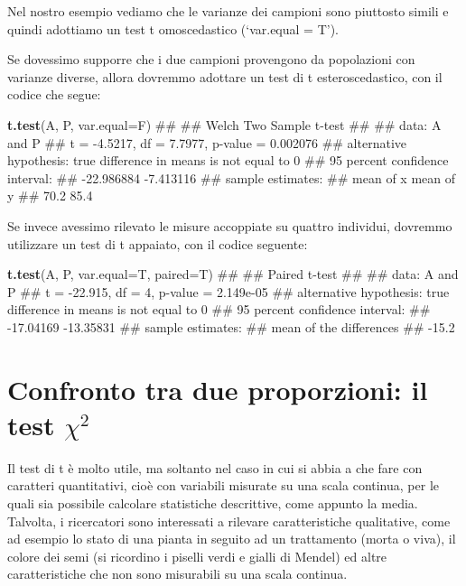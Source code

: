 \documentclass[a4paper,12pt,oneside]{book}
\newenvironment{Shaded}{\begin{snugshade}}{\end{snugshade}}
\newcommand{\KeywordTok}[1]{\textcolor[rgb]{0.13,0.29,0.53}{\textbf{#1}}}
\newcommand{\DataTypeTok}[1]{\textcolor[rgb]{0.13,0.29,0.53}{#1}}
\newcommand{\NormalTok}[1]{#1}
\theoremstyle{definition}
\theoremstyle{definition}
\theoremstyle{definition}
\theoremstyle{remark}
\begin{document}
Nel nostro esempio vediamo che le varianze dei campioni sono piuttosto
simili e quindi adottiamo un test t omoscedastico (`var.equal = T').

Se dovessimo supporre che i due campioni provengono da popolazioni con
varianze diverse, allora dovremmo adottare un test di t
esteroscedastico, con il codice che segue:

\begin{Shaded}
\begin{Highlighting}[]
\KeywordTok{t.test}\NormalTok{(A, P, }\DataTypeTok{var.equal=}\NormalTok{F)}
\NormalTok{## }
\NormalTok{##  Welch Two Sample t-test}
\NormalTok{## }
\NormalTok{## data:  A and P}
\NormalTok{## t = -4.5217, df = 7.7977, p-value = 0.002076}
\NormalTok{## alternative hypothesis: true difference in means is not equal to 0}
\NormalTok{## 95 percent confidence interval:}
\NormalTok{##  -22.986884  -7.413116}
\NormalTok{## sample estimates:}
\NormalTok{## mean of x mean of y }
\NormalTok{##      70.2      85.4}
\end{Highlighting}
\end{Shaded}

Se invece avessimo rilevato le misure accoppiate su quattro individui,
dovremmo utilizzare un test di t appaiato, con il codice seguente:

\begin{Shaded}
\begin{Highlighting}[]
\KeywordTok{t.test}\NormalTok{(A, P, }\DataTypeTok{var.equal=}\NormalTok{T, }\DataTypeTok{paired=}\NormalTok{T)}
\NormalTok{## }
\NormalTok{##  Paired t-test}
\NormalTok{## }
\NormalTok{## data:  A and P}
\NormalTok{## t = -22.915, df = 4, p-value = 2.149e-05}
\NormalTok{## alternative hypothesis: true difference in means is not equal to 0}
\NormalTok{## 95 percent confidence interval:}
\NormalTok{##  -17.04169 -13.35831}
\NormalTok{## sample estimates:}
\NormalTok{## mean of the differences }
\NormalTok{##                   -15.2}
\end{Highlighting}
\end{Shaded}

\section{\texorpdfstring{Confronto tra due proporzioni: il test
\(\chi^2\)}{Confronto tra due proporzioni: il test \textbackslash{}chi\^{}2}}\label{confronto-tra-due-proporzioni-il-test-chi2}

Il test di t è molto utile, ma soltanto nel caso in cui si abbia a che
fare con caratteri quantitativi, cioè con variabili misurate su una
scala continua, per le quali sia possibile calcolare statistiche
descrittive, come appunto la media. Talvolta, i ricercatori sono
interessati a rilevare caratteristiche qualitative, come ad esempio lo
stato di una pianta in seguito ad un trattamento (morta o viva), il
colore dei semi (si ricordino i piselli verdi e gialli di Mendel) ed
altre caratteristiche che non sono misurabili su una scala continua.
\end{document}
